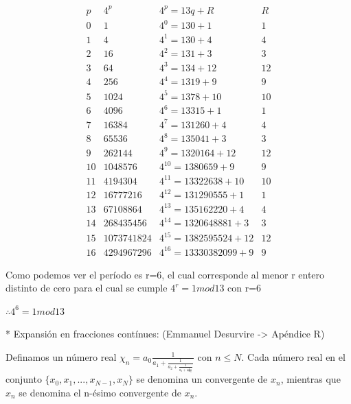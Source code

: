 \documentclass[11pt, spanish]{report}
\begin{document}
 \[\begin{matrix}
         p  &   4^p & 4^p = 13 q                    + R    &   R   \\
         0  &   1   & 4^0 = 13 0                    + 1    & 1     \\
         1  &   4   & 4^1 = 13 0                    + 4    & 4     \\
         2  &   16  & 4^2 = 13 1                    + 3    & 3     \\
         3  &   64  & 4^3 = 13 4                    + 12   & 12    \\
         4  &   256  & 4^4 = 13 19                  + 9    & 9     \\
         5  &   1024  & 4^5 = 13 78                 + 10   & 10    \\ %
         6  &   4096  & 4^6 = 13 315                + 1    & 1     \\
         7  &   16384  & 4^7 = 13 1260              + 4    & 4     \\
         8  &   65536  & 4^8 = 13 5041              + 3    & 3     \\
         9  &   262144  & 4^9 = 13 20164            + 12   & 12    \\
         10 &   1048576  & 4^10 = 13 80659          + 9    & 9     \\
         11 &   4194304  & 4^11 = 13 322638         + 10   & 10    \\
         12 &   16777216  & 4^12 = 13 1290555       + 1    & 1     \\
         13 &   67108864  & 4^13 = 13 5162220       + 4    & 4     \\
         14 &   268435456  & 4^14 = 13 20648881     + 3    & 3     \\
         15 &   1073741824  & 4^15 = 13 82595524    + 12   & 12    \\
         16 &   4294967296  & 4^16 = 13 330382099   + 9    & 9     
     \end{matrix}
 \]

 Como podemos ver el período es r=6, el cual corresponde al menor r entero distinto de cero para el cual se cumple $4^r=1 mod 13$ con r=6

 $\therefore 4^6 = 1 mod 13$

* Expansión en fracciones contínues: (Emmanuel Desurvire -> Apéndice R)

Definamos un número real $\chi_n = a_0 \frac{1}{a_1 + \frac{1}{a_2 + \frac{1}{a_3 + \frac{1}{... a_n}}}}$ con $n \leq N$. Cada número real en el conjunto $\{x_0,x_1,...,x_{N-1},x_N\}$ se denomina un convergente de $x_n$, mientras que $x_n$ se denomina el n-ésimo convergente de $x_n$.
\end{document}
